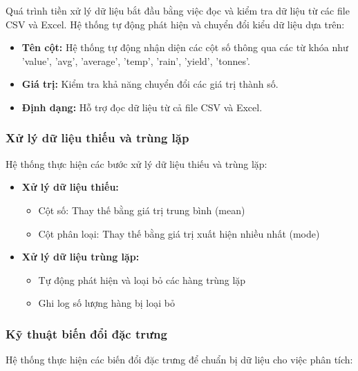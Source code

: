 \hspace{0.5cm}Quá trình tiền xử lý dữ liệu bắt đầu bằng việc đọc và kiểm tra dữ liệu từ các file CSV và Excel. Hệ thống tự động phát hiện và chuyển đổi kiểu dữ liệu dựa trên:

\begin{itemize}
    \item \textbf{Tên cột:} Hệ thống tự động nhận diện các cột số thông qua các từ khóa như 'value', 'avg', 'average', 'temp', 'rain', 'yield', 'tonnes'.
    \item \textbf{Giá trị:} Kiểm tra khả năng chuyển đổi các giá trị thành số.
    \item \textbf{Định dạng:} Hỗ trợ đọc dữ liệu từ cả file CSV và Excel.
\end{itemize}

\subsubsection{Xử lý dữ liệu thiếu và trùng lặp}

\hspace{0.5cm}Hệ thống thực hiện các bước xử lý dữ liệu thiếu và trùng lặp:

\begin{itemize}
    \item \textbf{Xử lý dữ liệu thiếu:}
    \begin{itemize}
        \item Cột số: Thay thế bằng giá trị trung bình (mean)
        \item Cột phân loại: Thay thế bằng giá trị xuất hiện nhiều nhất (mode)
    \end{itemize}
    
    \item \textbf{Xử lý dữ liệu trùng lặp:}
    \begin{itemize}
        \item Tự động phát hiện và loại bỏ các hàng trùng lặp
        \item Ghi log số lượng hàng bị loại bỏ
    \end{itemize}
\end{itemize}

\subsubsection{Kỹ thuật biến đổi đặc trưng}

\hspace{0.5cm}Hệ thống thực hiện các biến đổi đặc trưng để chuẩn bị dữ liệu cho việc phân tích:

